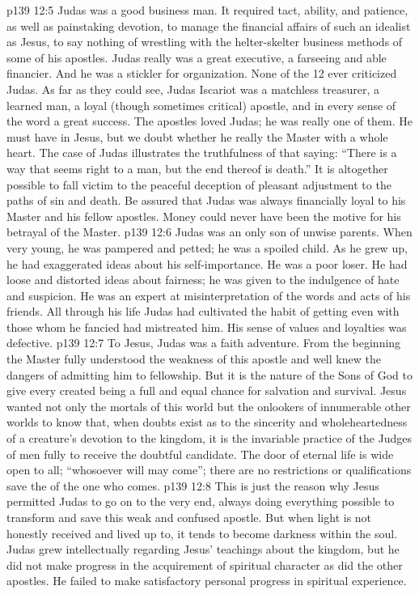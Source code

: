 \vs p139 12:5 \pc Judas was a good business man. It required tact, ability, and patience, as well as painstaking devotion, to manage the financial affairs of such an idealist as Jesus, to say nothing of wrestling with the helter\hyp{}skelter business methods of some of his apostles. Judas really was a great executive, a farseeing and able financier. And he was a stickler for organization. None of the 12 ever criticized Judas. As far as they could see, Judas Iscariot was a matchless treasurer, a learned man, a loyal (though sometimes critical) apostle, and in every sense of the word a great success. The apostles loved Judas; he was really one of them. He must have  in Jesus, but we doubt whether he really  the Master with a whole heart. The case of Judas illustrates the truthfulness of that saying: “There is a way that seems right to a man, but the end thereof is death.” It is altogether possible to fall victim to the peaceful deception of pleasant adjustment to the paths of sin and death. Be assured that Judas was always financially loyal to his Master and his fellow apostles. Money could never have been the motive for his betrayal of the Master.
\vs p139 12:6 Judas was an only son of unwise parents. When very young, he was pampered and petted; he was a spoiled child. As he grew up, he had exaggerated ideas about his self\hyp{}importance. He was a poor loser. He had loose and distorted ideas about fairness; he was given to the indulgence of hate and suspicion. He was an expert at misinterpretation of the words and acts of his friends. All through his life Judas had cultivated the habit of getting even with those whom he fancied had mistreated him. His sense of values and loyalties was defective.
\vs p139 12:7 \pc To Jesus, Judas was a faith adventure. From the beginning the Master fully understood the weakness of this apostle and well knew the dangers of admitting him to fellowship. But it is the nature of the Sons of God to give every created being a full and equal chance for salvation and survival. Jesus wanted not only the mortals of this world but the onlookers of innumerable other worlds to know that, when doubts exist as to the sincerity and wholeheartedness of a creature’s devotion to the kingdom, it is the invariable practice of the Judges of men fully to receive the doubtful candidate. The door of eternal life is wide open to all; “whosoever will may come”; there are no restrictions or qualifications save the  of the one who comes.
\vs p139 12:8 This is just the reason why Jesus permitted Judas to go on to the very end, always doing everything possible to transform and save this weak and confused apostle. But when light is not honestly received and lived up to, it tends to become darkness within the soul. Judas grew intellectually regarding Jesus’ teachings about the kingdom, but he did not make progress in the acquirement of spiritual character as did the other apostles. He failed to make satisfactory personal progress in spiritual experience.
